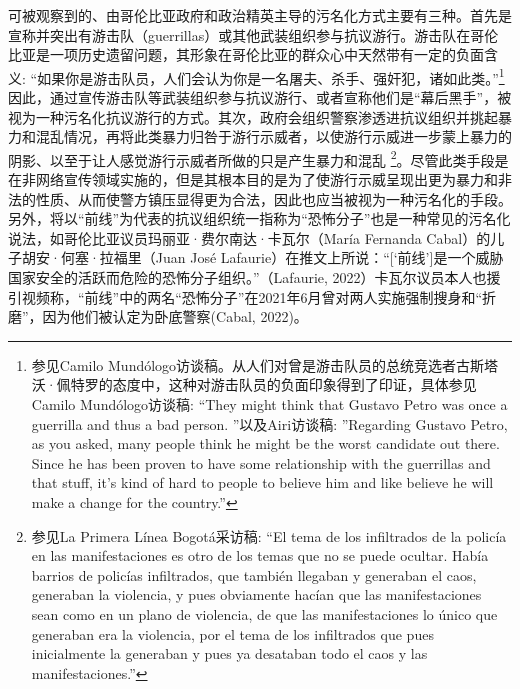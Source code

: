 \documentclass{phyasgn}\usepackage{nag}
\begin{document}
\par 可被观察到的、由哥伦比亚政府和政治精英主导的污名化方式主要有三种。首先是宣称并突出有游击队（guerrillas）或其他武装组织参与抗议游行。游击队在哥伦比亚是一项历史遗留问题，其形象在哥伦比亚的群众心中天然带有一定的负面含义: “如果你是游击队员，人们会认为你是一名屠夫、杀手、强奸犯，诸如此类。”\footnote[39]{参见Camilo Mundólogo访谈稿。从人们对曾是游击队员的总统竞选者古斯塔沃·佩特罗的态度中，这种对游击队员的负面印象得到了印证，具体参见Camilo Mundólogo访谈稿: “They might think that Gustavo Petro was once a guerrilla and thus a bad person. ”以及Airi访谈稿: ”Regarding Gustavo Petro, as you asked, many people think he might be the worst candidate out there. Since he has been proven to have some relationship with the guerrillas and that stuff, it's kind of hard to people to believe him and like believe he will make a change for the country.”}因此，通过宣传游击队等武装组织参与抗议游行、或者宣称他们是“幕后黑手”，被视为一种污名化抗议游行的方式。其次，政府会组织警察渗透进抗议组织并挑起暴力和混乱情况，再将此类暴力归咎于游行示威者，以使游行示威进一步蒙上暴力的阴影、以至于让人感觉游行示威者所做的只是产生暴力和混乱 \footnote[40]{参见La Primera Línea Bogotá采访稿: “El tema de los infiltrados de la policía en las manifestaciones es otro de los temas que no se puede ocultar. Había barrios de policías infiltrados, que también llegaban y generaban el caos, generaban la violencia, y pues obviamente hacían que las manifestaciones sean como en un plano de violencia, de que las manifestaciones lo único que generaban era la violencia, por el tema de los infiltrados que pues inicialmente la generaban y pues ya desataban todo el caos y las manifestaciones.” }。尽管此类手段是在非网络宣传领域实施的，但是其根本目的是为了使游行示威呈现出更为暴力和非法的性质、从而使警方镇压显得更为合法，因此也应当被视为一种污名化的手段。另外，将以“前线”为代表的抗议组织统一指称为“恐怖分子”也是一种常见的污名化说法，如哥伦比亚议员玛丽亚·费尔南达·卡瓦尔（María Fernanda Cabal）的儿子胡安·何塞·拉福里（Juan José Lafaurie）在推文上所说：“[‘前线’]是一个威胁国家安全的活跃而危险的恐怖分子组织。”（Lafaurie, 2022）卡瓦尔议员本人也援引视频称，“前线”中的两名“恐怖分子”在2021年6月曾对两人实施强制搜身和“折磨”，因为他们被认定为卧底警察(Cabal, 2022)。
\end{document}
